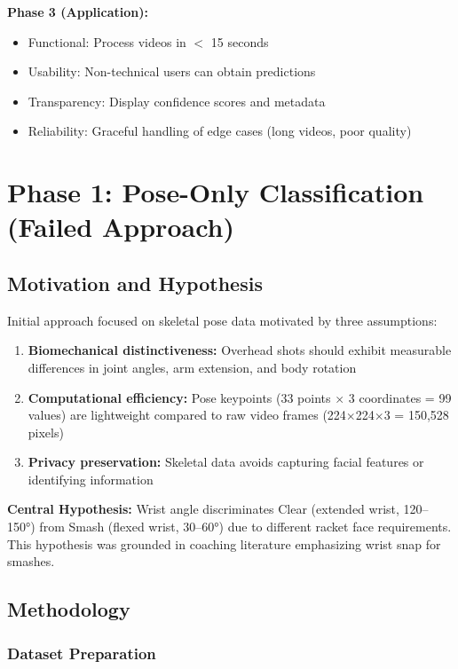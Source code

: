 \documentclass[11pt,a4paper]{article}
\begin{document}
\textbf{Phase 3 (Application):}
\begin{itemize}
\item Functional: Process videos in $<$ 15 seconds
\item Usability: Non-technical users can obtain predictions
\item Transparency: Display confidence scores and metadata
\item Reliability: Graceful handling of edge cases (long videos, poor quality)
\end{itemize}

\section{Phase 1: Pose-Only Classification (Failed Approach)}

\subsection{Motivation and Hypothesis}

Initial approach focused on skeletal pose data motivated by three assumptions:

\begin{enumerate}
\item \textbf{Biomechanical distinctiveness:} Overhead shots should exhibit measurable differences in joint angles, arm extension, and body rotation
\item \textbf{Computational efficiency:} Pose keypoints (33 points $\times$ 3 coordinates = 99 values) are lightweight compared to raw video frames (224$\times$224$\times$3 = 150,528 pixels)
\item \textbf{Privacy preservation:} Skeletal data avoids capturing facial features or identifying information
\end{enumerate}

\textbf{Central Hypothesis:} Wrist angle discriminates Clear (extended wrist, 120--150°) from Smash (flexed wrist, 30--60°) due to different racket face requirements. This hypothesis was grounded in coaching literature emphasizing wrist snap for smashes.

\subsection{Methodology}

\subsubsection{Dataset Preparation}
\end{document}
